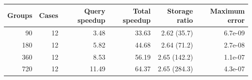 \begin{tabular}{rrrrrr}
\toprule
Groups & Cases & Query speedup & Total speedup & Storage ratio & Maximum error \\
\midrule
90 & 12 & 3.48 & 33.63 & 2.62 (35.7) & 6.7e-09 \\
180 & 12 & 5.82 & 44.68 & 2.64 (71.2) & 2.7e-08 \\
360 & 12 & 8.53 & 56.19 & 2.65 (142.2) & 1.1e-07 \\
720 & 12 & 11.49 & 64.37 & 2.65 (284.3) & 4.3e-07 \\
\bottomrule
\end{tabular}
